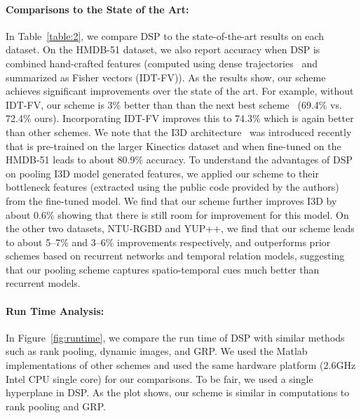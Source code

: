 \documentclass[runningheads]{llncs}
\begin{document}
\paragraph*{\textbf{Comparisons to the State of the Art:}} In Table~\ref{table:2}, we compare DSP to the state-of-the-art results on each dataset. On the HMDB-51 dataset, we also report accuracy when DSP is combined hand-crafted features (computed using dense trajectories~\cite{wang2013dense} and summarized as Fisher vectors (IDT-FV)). As the results show, our scheme achieves significant improvements over the state of the art. For example, without IDT-FV, our scheme is 3\% better than than the next best scheme~\cite{Wang2016} (69.4\% vs. 72.4\% ours). Incorporating IDT-FV improves this to 74.3\% which is again better than other schemes. We note that the I3D architecture~\cite{carreira2017quo} was introduced recently that is pre-trained on the larger Kinectics dataset and when fine-tuned on the HMDB-51 leads to about 80.9\% accuracy. To understand the advantages of DSP on pooling I3D model generated features, we applied our scheme to their bottleneck features (extracted using the public code provided by the authors) from the fine-tuned model. We find that our scheme further improves I3D by about 0.6\% showing that there is still room for improvement for this model. On the other two datasets, NTU-RGBD and YUP++, we find that our scheme leads to about 5--7\% and 3--6\% improvements respectively, and outperforms prior schemes based on recurrent networks and temporal relation models, suggesting that our pooling scheme  captures spatio-temporal cues much better than recurrent models. 

\paragraph*{\textbf{Run Time Analysis:}} In Figure~\ref{fig:runtime}, we compare the run time of DSP with similar methods such as rank pooling, dynamic images, and GRP. We used the Matlab implementations of other schemes and used the same hardware platform (2.6GHz Intel CPU single core) for our comparisons. To be fair, we used a single hyperplane in DSP. As the plot shows, our scheme is similar in computations to rank pooling and GRP.
\end{document}
